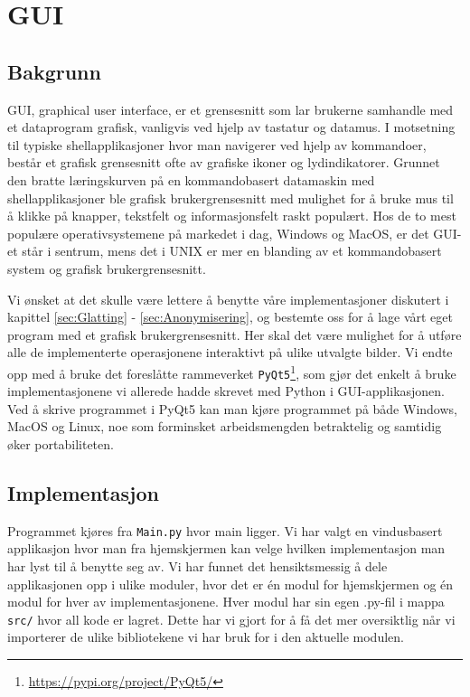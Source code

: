 \newpage
\section{GUI}
\label{sec:Gui}
\subsection{Bakgrunn}
GUI, graphical user interface, er et grensesnitt som lar brukerne samhandle med et dataprogram grafisk, vanligvis ved hjelp av tastatur og datamus. I motsetning til typiske shellapplikasjoner hvor man navigerer ved hjelp av kommandoer, består et grafisk grensesnitt ofte av grafiske ikoner og lydindikatorer\cite{wiki:GUI}. Grunnet den bratte læringskurven på en kommandobasert datamaskin med shellapplikasjoner ble grafisk brukergrensesnitt med mulighet for å bruke mus til å klikke på knapper, tekstfelt og informasjonsfelt raskt populært. Hos de to mest populære operativsystemene på markedet i dag, Windows og MacOS, er det GUI-et står i sentrum, mens det i UNIX er mer en blanding av et kommandobasert system og grafisk brukergrensesnitt.

Vi ønsket at det skulle være lettere å benytte våre implementasjoner diskutert i kapittel \ref{sec:Glatting} - \ref{sec:Anonymisering}, og bestemte oss for å lage vårt eget program med et grafisk brukergrensesnitt. Her skal det være mulighet for å utføre alle de implementerte operasjonene interaktivt på ulike utvalgte bilder. Vi endte opp med å bruke det foreslåtte rammeverket \texttt{PyQt5}\footnote{\url{https://pypi.org/project/PyQt5/}}, som gjør det enkelt å bruke implementasjonene vi allerede hadde skrevet med Python i GUI-applikasjonen. Ved å skrive programmet i PyQt5 kan man kjøre programmet på både Windows, MacOS og Linux, noe som forminsket arbeidsmengden betraktelig og samtidig øker portabiliteten.

\subsection{Implementasjon}
\label{sec:GUIimpl}
Programmet kjøres fra \texttt{Main.py} hvor main ligger. Vi har valgt en vindusbasert applikasjon hvor man fra hjemskjermen kan velge hvilken implementasjon man har lyst til å benytte seg av. Vi har funnet det hensiktsmessig å dele applikasjonen opp i ulike moduler, hvor det er én modul for hjemskjermen og én modul for hver av implementasjonene. Hver modul har sin egen .py-fil i mappa \texttt{src/} hvor all kode er lagret. Dette har vi gjort for å få det mer oversiktlig når vi importerer de ulike bibliotekene vi har bruk for i den aktuelle modulen. 

